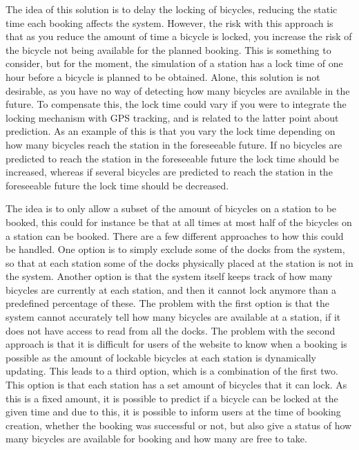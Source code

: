\begin{description}[style=nextline]
		\item[Lock late]
		The idea of this solution is to delay the locking of bicycles, reducing the static time each booking affects the system.
		However, the risk with this approach is that as you reduce the amount of time a bicycle is locked, you increase the risk of the bicycle not being available for the planned booking.
		This is something to consider, but for the moment, the simulation of a station has a lock time of one hour before a bicycle is planned to be obtained.
		Alone, this solution is not desirable, as you have no way of detecting how many bicycles are available in the future.
		To compensate this, the lock time could vary if you were to integrate the locking mechanism with GPS tracking, and is related to the latter point about prediction.
		As an example of this is that you vary the lock time depending on how many bicycles reach the station in the foreseeable future. 
		If no bicycles are predicted to reach the station in the foreseeable future the lock time should be increased, whereas if several bicycles are predicted to reach the station in the foreseeable future the lock time should be decreased.
		
		\item[Subset of bicycles for booking]
		The idea is to only allow a subset of the amount of bicycles on a station to be booked, this could for instance be that at all times at most half of the bicycles on a station can be booked.
		There are a few different approaches to how this could be handled.
		One option is to simply exclude some of the docks from the system, so that at each station some of the docks physically placed at the station is not in the system.
		Another option is that the system itself keeps track of how many bicycles are currently at each station, and then it cannot lock anymore than a predefined percentage of these.
		The problem with the first option is that the system cannot accurately tell how many bicycles are available at a station, if it does not have access to read from all the docks.
		The problem with the second approach is that it is difficult for users of the website to know when a booking is possible as the amount of lockable bicycles at each station is dynamically updating.
		This leads to a third option, which is a combination of the first two.
		This option is that each station has a set amount of bicycles that it can lock.
		As this is a fixed amount, it is possible to predict if a bicycle can be locked at the given time and due to this, it is possible to inform users at the time of booking creation, whether the booking was successful or not, but also give a status of how many bicycles are available for booking and how many are free to take.
		

\end{description}
